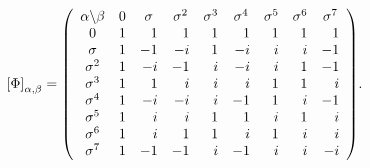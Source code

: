 \documentclass[quantumrep,article,submit,pdftex,moreauthors]{Definitions/mdpi}
\begin{document}
\begin{equation}
  \left[\Phi\right]_{\alpha ,\beta }
  = \left( 
    \begin{array}{ccccccccc}
      \alpha \backslash \beta  & 0 & \sigma  & \sigma ^{2} & \sigma ^{3} &
      \sigma^{4} & \sigma ^{5} & \sigma ^{6} & \sigma ^{7} \\ 
      0 & \multicolumn{1}{r}{1} & \multicolumn{1}{r}{1} & \multicolumn{1}{r}{1}
        & \multicolumn{1}{r}{1} & \multicolumn{1}{r}{1} & \multicolumn{1}{r}{1}
        & \multicolumn{1}{r}{1} & \multicolumn{1}{r}{1} \\ 
      \sigma  & \multicolumn{1}{r}{1} & \multicolumn{1}{r}{-1} &
      \multicolumn{1}{r}{-i} & \multicolumn{1}{r}{1} & \multicolumn{1}{r}{-i} &
      \multicolumn{1}{r}{i} & \multicolumn{1}{r}{i} & \multicolumn{1}{r}{-1} \\ 
      \sigma ^{2} & \multicolumn{1}{r}{1} & \multicolumn{1}{r}{-i} & 
      \multicolumn{1}{r}{-1} & \multicolumn{1}{r}{i} & \multicolumn{1}{r}{-i} & 
      \multicolumn{1}{r}{i} & \multicolumn{1}{r}{1} & \multicolumn{1}{r}{-1} \\ 
      \sigma ^{3} & \multicolumn{1}{r}{1} & \multicolumn{1}{r}{1} & 
      \multicolumn{1}{r}{i} & \multicolumn{1}{r}{i} & \multicolumn{1}{r}{i} & 
      \multicolumn{1}{r}{1} & \multicolumn{1}{r}{1} & \multicolumn{1}{r}{i} \\ 
      \sigma ^{4} & \multicolumn{1}{r}{1} & \multicolumn{1}{r}{-i} & 
      \multicolumn{1}{r}{-i} & \multicolumn{1}{r}{i} & \multicolumn{1}{r}{-1} & 
      \multicolumn{1}{r}{1} & \multicolumn{1}{r}{i} & \multicolumn{1}{r}{-1} \\ 
      \sigma ^{5} & \multicolumn{1}{r}{1} & \multicolumn{1}{r}{i} & 
      \multicolumn{1}{r}{i} & \multicolumn{1}{r}{1} & \multicolumn{1}{r}{1} & 
      \multicolumn{1}{r}{i} & \multicolumn{1}{r}{1} & \multicolumn{1}{r}{i} \\ 
      \sigma ^{6} & \multicolumn{1}{r}{1} & \multicolumn{1}{r}{i} & 
      \multicolumn{1}{r}{1} & \multicolumn{1}{r}{1} & \multicolumn{1}{r}{i} & 
      \multicolumn{1}{r}{1} & \multicolumn{1}{r}{i} & \multicolumn{1}{r}{i} \\ 
      \sigma ^{7} & \multicolumn{1}{r}{1} & \multicolumn{1}{r}{-1} & 
      \multicolumn{1}{r}{-1} & \multicolumn{1}{r}{i} & \multicolumn{1}{r}{-1} & 
      \multicolumn{1}{r}{i} & \multicolumn{1}{r}{i} & \multicolumn{1}{r}{-i}
      \end{array}
    \right).
  \label{ray dps}
\end{equation}
\end{document}
